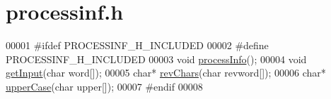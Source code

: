 \hypertarget{processinf_8h_source}{\section{processinf.\-h}
}

\begin{DoxyCode}
00001 \textcolor{preprocessor}{#ifdef PROCESSINF\_H\_INCLUDED}
00002 \textcolor{preprocessor}{}\textcolor{preprocessor}{#define PROCESSINF\_H\_INCLUDED}
00003 \textcolor{preprocessor}{}\textcolor{keywordtype}{void} \hyperlink{processinf_8c_a274a7c96e6aa087e9225b6fba27078cc}{processInfo}();
00004 \textcolor{keywordtype}{void} \hyperlink{processinf_8c_ac908e9757328e0bd76c4f1735c0e23cf}{getInput}(\textcolor{keywordtype}{char} word[]);
00005 \textcolor{keywordtype}{char}* \hyperlink{processinf_8c_a864995963222a536c6889b97738c70cc}{revChars}(\textcolor{keywordtype}{char} revword[]);
00006 \textcolor{keywordtype}{char}* \hyperlink{processinf_8c_aac315e3e21f46229bf88f2aad5608561}{upperCase}(\textcolor{keywordtype}{char} upper[]);
00007 \textcolor{preprocessor}{#endif}
00008 \textcolor{preprocessor}{}
\end{DoxyCode}
